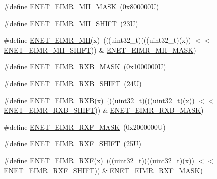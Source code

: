 \begin{DoxyCompactItemize}
\item 
\#define \mbox{\hyperlink{group___e_n_e_t___register___masks_ga76b5d13b0a814e6201d6d4815bf5afbd}{E\+N\+E\+T\+\_\+\+E\+I\+M\+R\+\_\+\+M\+I\+I\+\_\+\+M\+A\+SK}}~(0x800000\+U)
\item 
\#define \mbox{\hyperlink{group___e_n_e_t___register___masks_gaa6d43005c24a4fc636a2c1310aae4225}{E\+N\+E\+T\+\_\+\+E\+I\+M\+R\+\_\+\+M\+I\+I\+\_\+\+S\+H\+I\+FT}}~(23\+U)
\item 
\#define \mbox{\hyperlink{group___e_n_e_t___register___masks_ga5a29fdc2cf03be20b0bfccbf3b230ee2}{E\+N\+E\+T\+\_\+\+E\+I\+M\+R\+\_\+\+M\+II}}(x)~(((uint32\+\_\+t)(((uint32\+\_\+t)(x)) $<$$<$ \mbox{\hyperlink{group___e_n_e_t___register___masks_gaa6d43005c24a4fc636a2c1310aae4225}{E\+N\+E\+T\+\_\+\+E\+I\+M\+R\+\_\+\+M\+I\+I\+\_\+\+S\+H\+I\+FT}})) \& \mbox{\hyperlink{group___e_n_e_t___register___masks_ga76b5d13b0a814e6201d6d4815bf5afbd}{E\+N\+E\+T\+\_\+\+E\+I\+M\+R\+\_\+\+M\+I\+I\+\_\+\+M\+A\+SK}})
\item 
\#define \mbox{\hyperlink{group___e_n_e_t___register___masks_gade7a0df0826b6d0c11f3b0e545e17535}{E\+N\+E\+T\+\_\+\+E\+I\+M\+R\+\_\+\+R\+X\+B\+\_\+\+M\+A\+SK}}~(0x1000000\+U)
\item 
\#define \mbox{\hyperlink{group___e_n_e_t___register___masks_gab1b2e526363f6abb22c5d228e8bfb461}{E\+N\+E\+T\+\_\+\+E\+I\+M\+R\+\_\+\+R\+X\+B\+\_\+\+S\+H\+I\+FT}}~(24\+U)
\item 
\#define \mbox{\hyperlink{group___e_n_e_t___register___masks_ga434c1b70bdf110ea220d8427984c46d6}{E\+N\+E\+T\+\_\+\+E\+I\+M\+R\+\_\+\+R\+XB}}(x)~(((uint32\+\_\+t)(((uint32\+\_\+t)(x)) $<$$<$ \mbox{\hyperlink{group___e_n_e_t___register___masks_gab1b2e526363f6abb22c5d228e8bfb461}{E\+N\+E\+T\+\_\+\+E\+I\+M\+R\+\_\+\+R\+X\+B\+\_\+\+S\+H\+I\+FT}})) \& \mbox{\hyperlink{group___e_n_e_t___register___masks_gade7a0df0826b6d0c11f3b0e545e17535}{E\+N\+E\+T\+\_\+\+E\+I\+M\+R\+\_\+\+R\+X\+B\+\_\+\+M\+A\+SK}})
\item 
\#define \mbox{\hyperlink{group___e_n_e_t___register___masks_gaa22528ac89efc6fe663951b8c3eac045}{E\+N\+E\+T\+\_\+\+E\+I\+M\+R\+\_\+\+R\+X\+F\+\_\+\+M\+A\+SK}}~(0x2000000\+U)
\item 
\#define \mbox{\hyperlink{group___e_n_e_t___register___masks_ga78a295cf5fe590daeb081dafd03a9155}{E\+N\+E\+T\+\_\+\+E\+I\+M\+R\+\_\+\+R\+X\+F\+\_\+\+S\+H\+I\+FT}}~(25\+U)
\item 
\#define \mbox{\hyperlink{group___e_n_e_t___register___masks_ga8e80b3a395972e08e1cc90f77f0e1447}{E\+N\+E\+T\+\_\+\+E\+I\+M\+R\+\_\+\+R\+XF}}(x)~(((uint32\+\_\+t)(((uint32\+\_\+t)(x)) $<$$<$ \mbox{\hyperlink{group___e_n_e_t___register___masks_ga78a295cf5fe590daeb081dafd03a9155}{E\+N\+E\+T\+\_\+\+E\+I\+M\+R\+\_\+\+R\+X\+F\+\_\+\+S\+H\+I\+FT}})) \& \mbox{\hyperlink{group___e_n_e_t___register___masks_gaa22528ac89efc6fe663951b8c3eac045}{E\+N\+E\+T\+\_\+\+E\+I\+M\+R\+\_\+\+R\+X\+F\+\_\+\+M\+A\+SK}})
$$
\end{DoxyCompactItemize}
